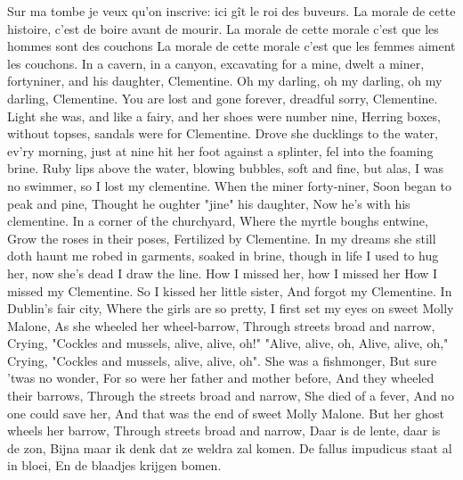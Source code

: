 \documentclass{article}
\begin{document}
\begin{songs}{}
\endverse
\beginverse
Sur ma tombe je veux qu’on inscrive:
ici gît le roi des buveurs.
La morale de cette histoire,
c’est de boire avant de mourir.
\endverse
\beginverse
La morale de cette morale
c’est que les hommes sont des couchons
La morale de cette morale
c’est que les femmes aiment les couchons.
\endverse
\endsong
{}
\beginverse
In a cavern, in a canyon,
excavating for a mine,
dwelt a miner, fortyniner, 
and his daughter, Clementine.
\endverse
\beginchorus
Oh my darling, oh my darling,
oh my darling, Clementine.
You are lost and gone forever,
dreadful sorry, Clementine.
\endchorus
\beginverse
Light she was, and like a fairy,
and her shoes were number nine,
Herring boxes, without topses,
sandals were for Clementine.
\endverse
\beginverse
Drove she ducklings to the water,
ev’ry morning, just at nine
hit her foot against a splinter,
fel into the foaming brine.
\endverse
\beginverse
Ruby lips above the water,
blowing bubbles, soft and fine,
but alas, I was no swimmer, 
so I lost my clementine.
\endverse
\beginverse
When the miner forty-niner,
Soon began to peak and pine,
Thought he oughter "jine" his daughter,
Now he's with his clementine.
\endverse
\beginverse
In a corner of the churchyard,
Where the myrtle boughs entwine,
Grow the roses in their poses,
Fertilized by Clementine.
\endverse
\beginverse
In my dreams she still doth haunt me
robed in garments, soaked in brine,
though in life I used to hug her, 
now she’s dead I draw the line.
\endverse
\beginverse
How I missed her, how I missed her
How I missed my Clementine.
So I kissed her little sister,
And forgot my Clementine.
\endverse
\endsong
{}
\beginverse
In Dublin's fair city, Where the girls are so pretty,
I first set my eyes on sweet Molly Malone,
As she wheeled her wheel-barrow,
Through streets broad and narrow,
\endverse
\beginchorus
Crying, "Cockles and mussels, alive, alive, oh!"
"Alive, alive, oh, Alive, alive, oh,"
Crying,  "Cockles and mussels, alive, alive, oh".
\endchorus
\beginverse
She was a fishmonger, But sure 'twas no wonder,
For so were her father and mother before,
And they wheeled their barrows,
Through the streets broad and narrow,
\endverse
\beginverse
She died of a fever, And no one could save her,
And that was the end of sweet Molly Malone.
But her ghost wheels her barrow,
Through streets broad and narrow,
\endverse
\endsong
{}
\beginverse*
Daar is de lente, daar is de zon,
Bijna maar ik denk dat ze weldra zal komen.
De fallus impudicus staat al in bloei,
En de blaadjes krijgen bomen. 
\endverse
\beginverse*

\end{songs}
\end{document}
